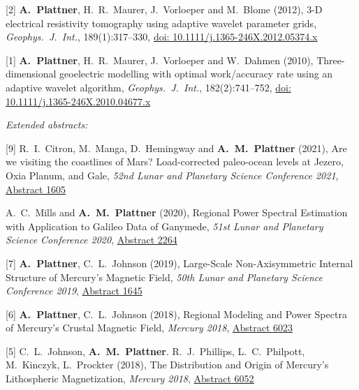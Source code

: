\documentclass[10pt]{article}
\begin{document}
\spcp
\hspace{-0.5cm}[2] \textbf{A.~Plattner}, H.~R.~Maurer, J.~Vorloeper and M.~Blome (2012),
3-D electrical resistivity tomography using adaptive wavelet parameter grids,
\emph{Geophys.~J.~Int.}, 189(1):317--330,
\href{https://academic.oup.com/gji/article-lookup/doi/10.1111/j.1365-246X.2012.05374.x}{doi: 10.1111/j.1365-246X.2012.05374.x}

\spcp
\hspace{-0.5cm}[1] \textbf{A.~Plattner}, H.~R.~Maurer, J.~Vorloeper and W.~Dahmen (2010),
Three-dimensional geoelectric modelling with optimal work/accuracy rate 
using an adaptive wavelet algorithm,
\emph{Geophys.~J.~Int.}, 182(2):741--752,
\href{https://academic.oup.com/gji/article-lookup/doi/10.1111/j.1365-246X.2010.04677.x}{doi: 10.1111/j.1365-246X.2010.04677.x}

\spc
\emph{Extended abstracts:}

\spcp
\hspace{-0.5cm}[9] R.~I.~Citron, M.~Manga, D.~Hemingway and \textbf{A.~M.~Plattner} (2021),
Are we visiting the coastlines of Mars? Load-corrected paleo-ocean levels at Jezero, Oxia Planum, and Gale,
\emph{52nd Lunar and Planetary Science Conference 2021},
\href{https://www.hou.usra.edu/meetings/lpsc2021/pdf/1605.pdf}{Abstract 1605}

\spcp
\hspace{-0.77cm} \gr[8] A.~C.~Mills and \textbf{A.~M.~Plattner}
(2020),
Regional Power Spectral Estimation with Application to Galileo Data of Ganymede,
\emph{51st Lunar and Planetary Science Conference 2020},
\href{https://www.hou.usra.edu/meetings/lpsc2020/pdf/2264.pdf}{Abstract 2264}

\spcp
\hspace{-0.5cm}[7] \textbf{A.~Plattner}, C.~L.~Johnson (2019), Large-Scale Non-Axisymmetric Internal Structure of Mercury's Magnetic Field,
\emph{50th Lunar and Planetary Science Conference 2019},
\href{https://www.hou.usra.edu/meetings/lpsc2019/pdf/1645.pdf}{Abstract 1645}


\spcp
\hspace{-0.5cm}[6] \textbf{A.~Plattner}, C.~L.~Johnson (2018),
Regional Modeling and Power Spectra of Mercury's Crustal Magnetic Field,
\emph{Mercury 2018},
\href{https://www.hou.usra.edu/meetings/mercury2018/pdf/6023.pdf}{Abstract 6023}

\spcp
\hspace{-0.5cm}[5] C.~L.~Johnson,
\textbf{A.~M.~Plattner}. R.~J.~Phillips, L.~C.~Philpott, M.~Kinczyk,
L.~Prockter (2018), The Distribution and Origin of Mercury's Lithospheric Magnetization, \emph{Mercury 2018},
\href{https://www.hou.usra.edu/meetings/mercury2018/pdf/6052.pdf}{Abstract
  6052}
\end{document}
